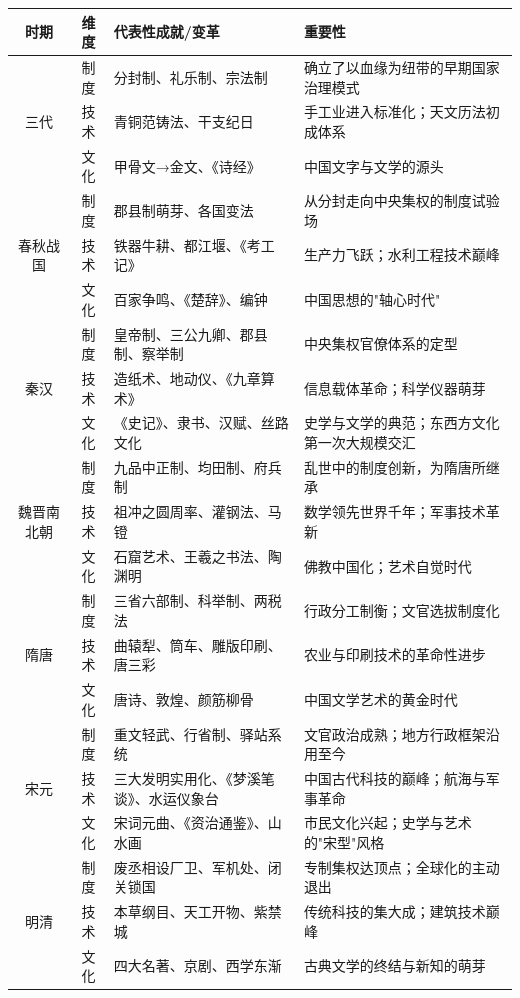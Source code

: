 \documentclass[a4paper,12pt]{ctexart}
\begin{document}
\vspace{0.2cm}
{\small
\begin{center}
\begin{tabular}{|c|c|p{5cm}|p{4.5cm}|}
\hline
\textbf{时期} & \textbf{维度} & \textbf{代表性成就/变革} & \textbf{重要性} \\
\hline
\multirow{3}{*}{三代} & 制度 & 分封制、礼乐制、宗法制 & 确立了以血缘为纽带的早期国家治理模式 \\
\cline{2-4}
 & 技术 & 青铜范铸法、干支纪日 & 手工业进入标准化；天文历法初成体系 \\
\cline{2-4}
 & 文化 & 甲骨文→金文、《诗经》 & 中国文字与文学的源头 \\
\hline
\multirow{3}{*}{春秋战国} & 制度 & 郡县制萌芽、各国变法 & 从分封走向中央集权的制度试验场 \\
\cline{2-4}
 & 技术 & 铁器牛耕、都江堰、《考工记》 & 生产力飞跃；水利工程技术巅峰 \\
\cline{2-4}
 & 文化 & 百家争鸣、《楚辞》、编钟 & 中国思想的"轴心时代" \\
\hline
\multirow{3}{*}{秦汉} & 制度 & 皇帝制、三公九卿、郡县制、察举制 & 中央集权官僚体系的定型 \\
\cline{2-4}
 & 技术 & 造纸术、地动仪、《九章算术》 & 信息载体革命；科学仪器萌芽 \\
\cline{2-4}
 & 文化 & 《史记》、隶书、汉赋、丝路文化 & 史学与文学的典范；东西方文化第一次大规模交汇 \\
\hline
\multirow{3}{*}{魏晋南北朝} & 制度 & 九品中正制、均田制、府兵制 & 乱世中的制度创新，为隋唐所继承 \\
\cline{2-4}
 & 技术 & 祖冲之圆周率、灌钢法、马镫 & 数学领先世界千年；军事技术革新 \\
\cline{2-4}
 & 文化 & 石窟艺术、王羲之书法、陶渊明 & 佛教中国化；艺术自觉时代 \\
\hline
\multirow{3}{*}{隋唐} & 制度 & 三省六部制、科举制、两税法 & 行政分工制衡；文官选拔制度化 \\
\cline{2-4}
 & 技术 & 曲辕犁、筒车、雕版印刷、唐三彩 & 农业与印刷技术的革命性进步 \\
\cline{2-4}
 & 文化 & 唐诗、敦煌、颜筋柳骨 & 中国文学艺术的黄金时代 \\
\hline
\multirow{3}{*}{宋元} & 制度 & 重文轻武、行省制、驿站系统 & 文官政治成熟；地方行政框架沿用至今 \\
\cline{2-4}
 & 技术 & 三大发明实用化、《梦溪笔谈》、水运仪象台 & 中国古代科技的巅峰；航海与军事革命 \\
\cline{2-4}
 & 文化 & 宋词元曲、《资治通鉴》、山水画 & 市民文化兴起；史学与艺术的"宋型"风格 \\
\hline
\multirow{3}{*}{明清} & 制度 & 废丞相设厂卫、军机处、闭关锁国 & 专制集权达顶点；全球化的主动退出 \\
\cline{2-4}
 & 技术 & 本草纲目、天工开物、紫禁城 & 传统科技的集大成；建筑技术巅峰 \\
\cline{2-4}
 & 文化 & 四大名著、京剧、西学东渐 & 古典文学的终结与新知的萌芽 \\
\hline
\end{tabular}
\end{center}
}
\end{document}
